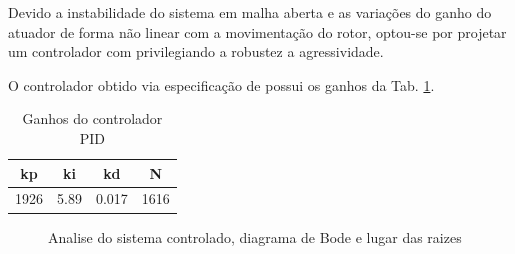 Devido a instabilidade do sistema em malha aberta e as variações do ganho do atuador de forma não linear com a movimentação do rotor, optou-se por projetar um controlador com privilegiando a robustez a agressividade.

O controlador obtido via especificação de possui os ganhos da  Tab. \ref{tab:controle:pid}.

\begin{table}[ht!]
\centering
	\begin{tabular}{c c c c}
	 kp  &  ki & kd &  N  \\
	 \hline \hline
		1926	 &	5.89	& 0.017	&1616
	\end{tabular} 
	\caption{Ganhos do controlador PID}
	\label{tab:controle:pid}
\end{table}


	\begin{figure}[!ht]
		\caption{Analise do sistema controlado, diagrama de Bode e lugar das raizes}
		\label{Fig:controle:analise}
	\end{figure}

